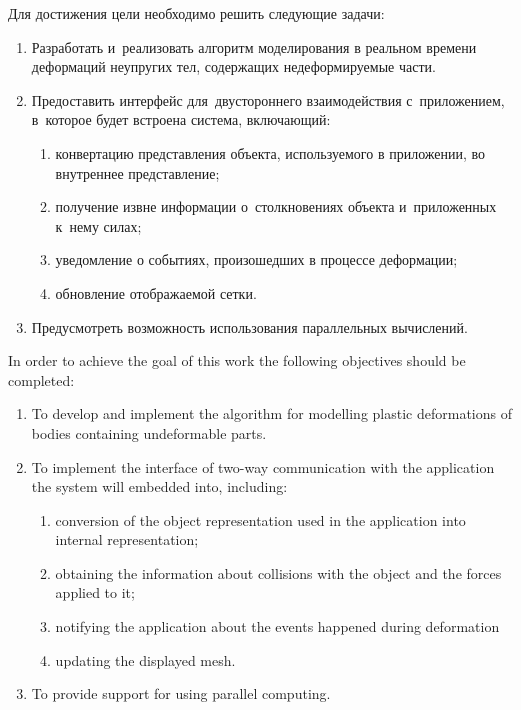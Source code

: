 \documentclass[a4paper, 12pt, titlepage]{extarticle}
\begin{document}
\begin{original}
    Для достижения цели необходимо решить следующие задачи:
    \begin{enumerate}
      \item Разработать и~реализовать алгоритм моделирования в реальном времени деформаций
        не\-у\-пру\-гих тел, содержащих недеформируемые части.
      \item Предоставить интерфейс для~двустороннего взаимодействия с~приложением, в~которое будет
        встроена система, включающий:
        \begin{enumerate}
          \item конвертацию представления объекта, используемого в приложении, во внутреннее представление;
          \item получение извне информации о~столкновениях объекта и~приложенных к~нему силах;
          \item уведомление о событиях, произошедших в процессе деформации;
          \item обновление отображаемой сетки.
        \end{enumerate}
      \item Предусмотреть возможность использования параллельных вычислений.
    \end{enumerate}
\end{original}

    In order to achieve the goal of this work the following objectives should be completed:
    \begin{enumerate}
      \item To develop and implement the algorithm for modelling plastic deformations of bodies
        containing undeformable parts.
      \item To implement the interface of two-way communication with the application the system will
        embedded into, including:
        \begin{enumerate}
          \item conversion of the object representation used in the application into internal representation;
          \item obtaining the information about collisions with the object and the forces applied to it;
          \item notifying the application about the events happened during deformation
          \item updating the displayed mesh.
        \end{enumerate}
      \item To provide support for using parallel computing.
    \end{enumerate}
\end{document}
